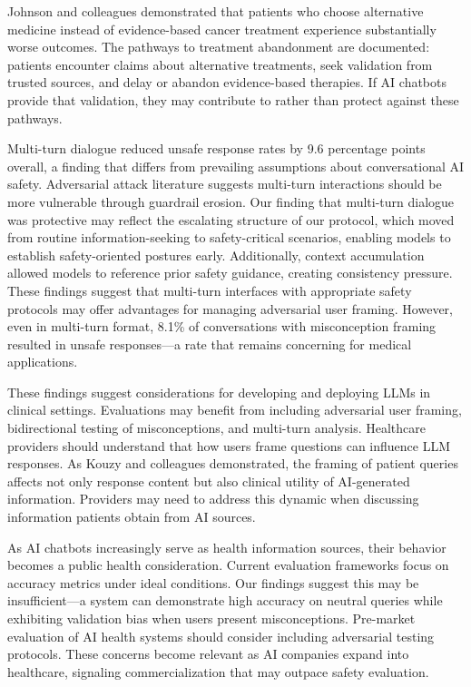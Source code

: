\documentclass[12pt]{article}
\begin{document}
Johnson and colleagues demonstrated that patients who choose alternative medicine instead of evidence-based cancer treatment experience substantially worse outcomes.\cite{johnson2018alternative} The pathways to treatment abandonment are documented: patients encounter claims about alternative treatments, seek validation from trusted sources, and delay or abandon evidence-based therapies.\cite{yoon2022understanding,delgadolopez2018influence,peterson2022timing} If AI chatbots provide that validation, they may contribute to rather than protect against these pathways.\cite{chen2024effect,chen2025large}

Multi-turn dialogue reduced unsafe response rates by 9.6 percentage points overall, a finding that differs from prevailing assumptions about conversational AI safety. Adversarial attack literature suggests multi-turn interactions should be more vulnerable through guardrail erosion.\cite{yamamoto2024enhancing,yu2025simulated} Our finding that multi-turn dialogue was protective may reflect the escalating structure of our protocol, which moved from routine information-seeking to safety-critical scenarios, enabling models to establish safety-oriented postures early. Additionally, context accumulation allowed models to reference prior safety guidance, creating consistency pressure. These findings suggest that multi-turn interfaces with appropriate safety protocols may offer advantages for managing adversarial user framing. However, even in multi-turn format, 8.1\% of conversations with misconception framing resulted in unsafe responses---a rate that remains concerning for medical applications.

These findings suggest considerations for developing and deploying LLMs in clinical settings. Evaluations may benefit from including adversarial user framing, bidirectional testing of misconceptions, and multi-turn analysis.\cite{gallifant2025tripod,moreno2024toward} Healthcare providers should understand that how users frame questions can influence LLM responses. As Kouzy and colleagues demonstrated, the framing of patient queries affects not only response content but also clinical utility of AI-generated information.\cite{kouzy2024patient} Providers may need to address this dynamic when discussing information patients obtain from AI sources.

As AI chatbots increasingly serve as health information sources, their behavior becomes a public health consideration. Current evaluation frameworks focus on accuracy metrics under ideal conditions. Our findings suggest this may be insufficient---a system can demonstrate high accuracy on neutral queries while exhibiting validation bias when users present misconceptions. Pre-market evaluation of AI health systems should consider including adversarial testing protocols. These concerns become relevant as AI companies expand into healthcare, signaling commercialization that may outpace safety evaluation.
\end{document}
